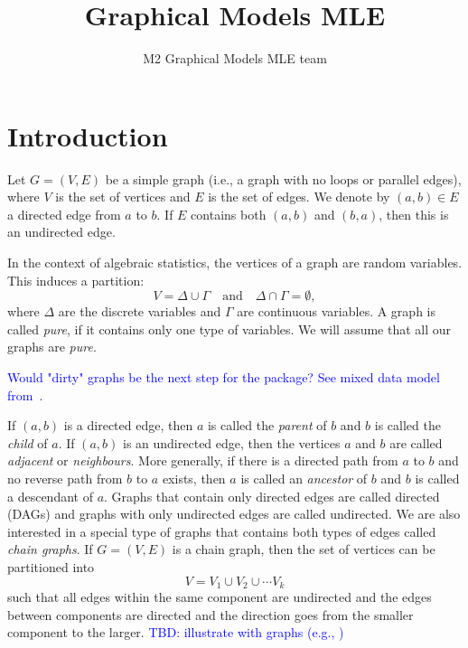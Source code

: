 \documentclass[10pt,a4paper]{article}
\author{M2 Graphical Models MLE team}
\title{Graphical Models MLE}
\begin{document}
\maketitle

\tableofcontents
\section{Introduction}
Let $G=(V,E)$ be a simple graph (i.e., a graph with no loops or parallel edges), where $V$ is the set of vertices and $E$ is the set of edges. We denote by $(a,b)\in E$ a directed edge from $a$ to $b$. If $E$ contains both $(a,b)$ and $(b,a)$, then this is an undirected  edge. 

In the context of algebraic statistics, the vertices of a graph are random variables. This induces a partition:
\[V=\Delta \cup \Gamma \quad \text{and} \quad \Delta \cap \Gamma=\emptyset,\]
where $\Delta$ are the discrete variables and $\Gamma$ are continuous variables. A graph is called \emph{pure}, if it contains only one type of variables.  We will assume that all our graphs are \emph{pure}.

\textcolor{blue}{Would "dirty" graphs be the next step for the package? See mixed data model from~\cite[Chapter 6.1.1]{lauritzen1996graphical}.}

If $(a,b)$ is a directed edge, then $a$ is called the \emph{parent} of $b$ and $b$ is called the \emph{child} of $a$. If $(a,b)$ is an undirected edge, then the vertices $a$ and $b$ are called \emph{adjacent} or \emph{neighbours}. More generally, if there is a directed path from $a$ to $b$ and no reverse path from $b$ to $a$ exists, then $a$ is called an \emph{ancestor} of $b$ and $b$ is called a descendant of $a$. 
Graphs that contain only directed edges are called directed  (DAGs) and graphs with only undirected edges are called undirected. We are also interested in a special type of graphs that contains both types of edges called \emph{chain graphs}. If $G=(V,E)$ is a chain graph, then the set of vertices can be partitioned into
\[V=V_1 \cup V_2 \cup \cdots V_k\]
such that all edges within the same component are undirected and the edges between components are directed and the direction goes from the smaller component to the larger. 
\textcolor{blue}{TBD: illustrate with graphs (e.g., \cite[p. 6 Fig 2.2]{lauritzen1996graphical} )}
\end{document}

